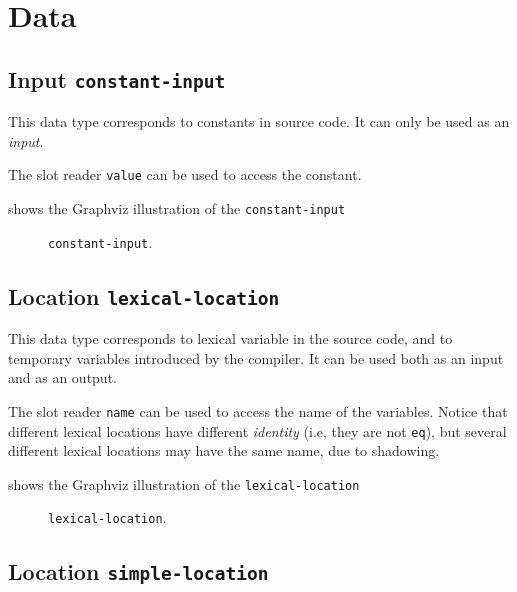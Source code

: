 \section{Data}

\subsection{Input \texttt{constant-input}}

This data type corresponds to constants in source code.  It can only
be used as an \emph{input}.

The slot reader \texttt{value} can be used to access the constant. 

 shows the Graphviz illustration of the
\texttt{constant-input}

\begin{figure}
\begin{center}
\end{center}
\caption{\label{fig-constant-input}
\texttt{constant-input}.}
\end{figure}

\subsection{Location \texttt{lexical-location}}

This data type corresponds to lexical variable in the source code, and
to temporary variables introduced by the compiler.  It can be used
both as an input and as an output.

The slot reader \texttt{name} can be used to access the name of the
variables.  Notice that different lexical locations have different
\emph{identity} (i.e, they are not \texttt{eq}), but several different
lexical locations may have the same name, due to shadowing.

 shows the Graphviz illustration of the
\texttt{lexical-location}

\begin{figure}
\begin{center}
\end{center}
\caption{\label{fig-lexical-location}
\texttt{lexical-location}.}
\end{figure}

\subsection{Location \texttt{simple-location}}

